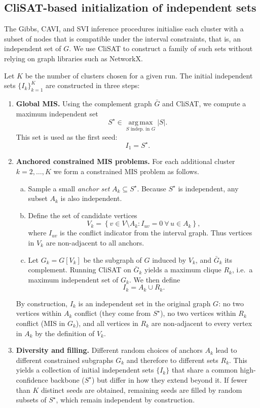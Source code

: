 \documentclass[11pt]{article}
\begin{document}
\subsection{CliSAT-based initialization of independent sets}

The Gibbs, CAVI, and SVI inference procedures initialise each cluster
with a subset of nodes that is compatible under the interval constraints,
that is, an independent set of \(G\). We use CliSAT to construct a family of
such sets without relying on graph libraries such as NetworkX.

Let \(K\) be the number of clusters chosen for a given run. The initial
independent sets \(\{I_k\}_{k=1}^K\) are constructed in three steps:
\begin{enumerate}
  \item \textbf{Global MIS.} Using the complement graph \(\bar{G}\) and
  CliSAT, we compute a maximum independent set
  \[
    S^\star \in \operatorname*{arg\,max}_{S \text{ indep. in } G} |S|.
  \]
  This set is used as the first seed:
  \[
    I_1 = S^\star.
  \]

  \item \textbf{Anchored constrained MIS problems.} For each additional
  cluster \(k = 2,\dots,K\) we form a constrained MIS problem as follows.
  \begin{enumerate}[(a)]
    \item Sample a small \emph{anchor set}
    \(A_k \subseteq S^\star\). Because \(S^\star\) is independent, any subset
    \(A_k\) is also independent.
    \item Define the set of candidate vertices
    \[
      V_k = \left\{v \in V \setminus A_k :
        I_{uv} = 0 \ \forall\,u \in A_k \right\},
    \]
    where \(I_{uv}\) is the conflict indicator from the interval graph.
    Thus vertices in \(V_k\) are non-adjacent to all anchors.
    \item Let \(G_k = G[V_k]\) be the subgraph of \(G\) induced by \(V_k\),
    and \(\bar{G}_k\) its complement. Running CliSAT on \(\bar{G}_k\) yields
    a maximum clique \(R_k\), i.e.\ a maximum independent set of \(G_k\).
    We then define
    \[
      I_k = A_k \cup R_k.
    \]
  \end{enumerate}
  By construction, \(I_k\) is an independent set in the original graph \(G\):
  no two vertices within \(A_k\) conflict (they come from \(S^\star\)), no two
  vertices within \(R_k\) conflict (MIS in \(G_k\)), and all vertices in
  \(R_k\) are non-adjacent to every vertex in \(A_k\) by the definition of
  \(V_k\).

  \item \textbf{Diversity and filling.} Different random choices of anchors
  \(A_k\) lead to different constrained subgraphs \(G_k\) and therefore to
  different sets \(R_k\). This yields a collection of initial independent
  sets \(\{I_k\}\) that share a common high-confidence backbone
  (\(S^\star\)) but differ in how they extend beyond it. If fewer than \(K\)
  distinct seeds are obtained, remaining seeds are filled by random subsets
  of \(S^\star\), which remain independent by construction.
\end{enumerate}
\end{document}
